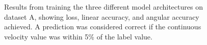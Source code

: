 \documentclass{article}
\begin{document}
\begin{figure}
  \par
  \hfill
  \hfill
  \caption{Results from training the three different model architectures on dataset A, showing loss, linear accuracy, and angular accuracy achieved. A prediction was considered correct if the continuous velocity value was within 5\% of the label value.}
  \label{fig:training_results}
\end{figure}



\end{document}
